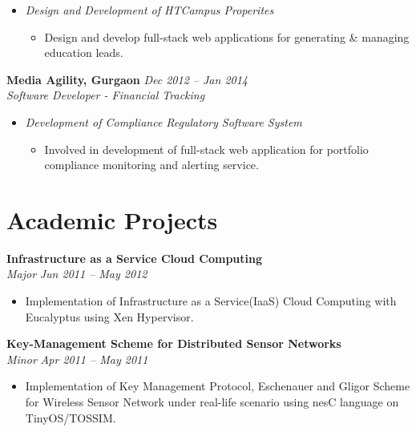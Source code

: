 \documentclass[margin,line]{resume}
\begin{document}
\begin{resume}
\begin{itemize}
     \item \textsl{Design and Development of HTCampus Properites}
        \begin{itemize}
            \item Design and develop full-stack web applications for generating \& managing education leads.
        \end{itemize}
   \end{itemize}

\textbf{Media Agility, Gurgaon}   \hfill \textsl{Dec 2012 -- Jan 2014} \vspace{0mm}\\\vspace{0mm}%
           \textsl{Software Developer - Financial Tracking}\\
    \begin{itemize}
    
     \item \textsl{Development of Compliance Regulatory Software System} 
        \begin{itemize}
            \item Involved in development of full-stack web application for portfolio compliance monitoring and alerting service.
        \end{itemize}
    
    \end{itemize}

    
    \section{\mysidestyle Academic Projects}
    \textbf{Infrastructure as a Service Cloud Computing}\vspace{0mm}\\\vspace{0mm}%
    \textsl{Major} \hfill \textsl{Jun 2011 -- May 2012}
       \begin{itemize} 
	        \item Implementation of Infrastructure as a Service(IaaS) Cloud Computing with Eucalyptus using Xen Hypervisor.
       \end{itemize}

    \textbf{Key-Management Scheme for Distributed Sensor Networks}\vspace{0mm}\\\vspace{0mm}%
    \textsl{Minor} \hfill \textsl{Apr 2011 -- May 2011}
       \begin{itemize} 
            \item Implementation of Key Management Protocol, Eschenauer and Gligor Scheme for Wireless Sensor Network under real-life scenario using nesC language on TinyOS/TOSSIM.
       \end{itemize}
\end{resume}
\end{document}
